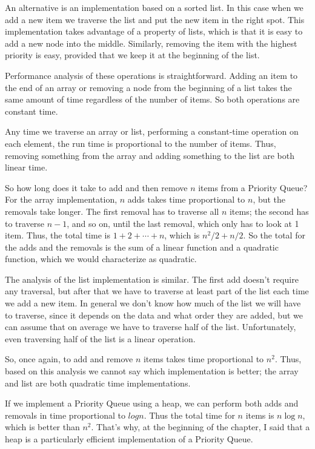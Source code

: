 An alternative is an implementation based on a sorted list.
In this case when we add a new item we traverse the list and
put the new item in the right spot.  This implementation takes
advantage of a property of lists, which is that it is easy to
add a new node into the middle.  Similarly, removing the
item with the highest priority is easy, provided that we
keep it at the beginning of the list.

Performance analysis of these operations is straightforward.
Adding an item to the end of an array or
removing a node from the beginning of a list takes the same amount
of time regardless of the number of items.  So both operations
are constant time.


Any time we traverse an array or list, performing a constant-time
operation on each element, the run time is
proportional to the number of items.  Thus, removing something
from the array and adding something to the list are both
linear time.


So how long does it take to add and then remove $n$ items
from a Priority Queue?  For the array implementation, $n$
adds takes time proportional to $n$, but the removals
take longer.  The first removal has to traverse all $n$ items;
the second has to traverse $n-1$, and so on, until the last
removal, which only has to look at 1 item.  Thus, the total
time is $1 + 2 + \cdots + n$, which is $n^2/2 + n/2$.
So the total for the adds and the removals is the
sum of a linear function and a quadratic function, which
we would characterize as quadratic.

The analysis of the list implementation is similar.  The
first add doesn't require any traversal, but after that
we have to traverse at least part of the list each time we
add a new item.  In general we don't know how much of the
list we will have to traverse, since it depends on the data
and what order they are added, but we can assume that on
average we have to traverse half of the list.  Unfortunately,
even traversing half of the list is a linear operation.

So, once again, to add and remove $n$ items takes time
proportional to $n^2$.  Thus, based on this analysis we cannot
say which implementation is better; the array and
list are both quadratic time implementations.

If we implement a Priority Queue using a heap, we can
perform both adds and removals in time proportional
to $log n$.  Thus the total time for $n$ items is $n \log n$,
which is better than $n^2$.  That's why, at the beginning of
the chapter, I said that a heap is a particularly efficient
implementation of a Priority Queue.


